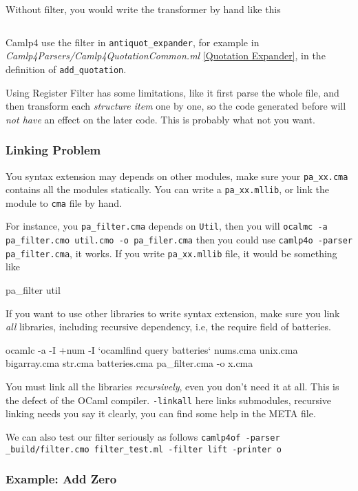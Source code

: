 Without filter, you would write the transformer by hand like this
\inputminted[fontsize=\scriptsize, fontsize=\scriptsize,
]{ocaml}{code/camlp4/filters/ast_map/ast_map_o.ml}

Camlp4 use the filter in \verb|antiquot_expander|, for example in
\textit{Camlp4Parsers/Camlp4QuotationCommon.ml} \ref{Quotation
  Expander}, in the definition of \verb|add_quotation|.

Using Register Filter has some limitations, like it first parse the
whole file, and then transform each \textit{structure item} one by one,
so the code generated before will \textit{not have} an effect on the
later code. This is probably what not you want.

\subsubsection{Linking Problem}
You syntax extension may depends on other modules, make sure your
\verb|pa_xx.cma| contains all the modules statically. You can write a
\verb|pa_xx.mllib|, or link the module to \verb|cma| file by hand.

For instance, you \verb|pa_filter.cma| depends on \verb|Util|, then
you will 
\verb|ocalmc -a pa_filter.cmo util.cmo -o pa_filer.cma|
then you could use \verb|camlp4o -parser pa_filter.cma|, it works.
If you write \verb|pa_xx.mllib| file, it would be something like
\begin{bluetext}
pa_filter
util
\end{bluetext}
If you want to use other libraries to write syntax extension, make
sure you link \textit{all} libraries, including recursive dependency,
i.e, the require field of batteries.
\begin{bluetext}
ocamlc -a  -I +num -I `ocamlfind query batteries` nums.cma unix.cma
bigarray.cma str.cma batteries.cma pa_filter.cma -o x.cma
\end{bluetext}

You must link all the libraries \textit{recursively}, even you don't
need it at all. This is the defect of the OCaml compiler.
\verb|-linkall| here links submodules, recursive linking needs you say
it clearly,  you can find some  help in the META file.

We can also test our filter seriously as follows 
\verb|camlp4of -parser _build/filter.cmo filter_test.ml -filter lift -printer o |


\subsubsection{Example: Add Zero}
\inputminted[fontsize=\scriptsize,lastline=10,bgcolor=lightlightgray]
{ocaml}{code/camlp4/filters/add_zero/ast_add_zero.ml}

